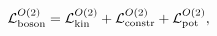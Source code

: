 \begin{equation}
 {\cal L}_{\rm boson}^{O(2)} = 
 {\cal L}_{\rm kin}^{O(2)} + 
 {\cal L}_{\rm constr}^{O(2)} + 
 {\cal L}_{\rm pot}^{O(2)},  
\label{eq:N1O2boson}
\end{equation}

